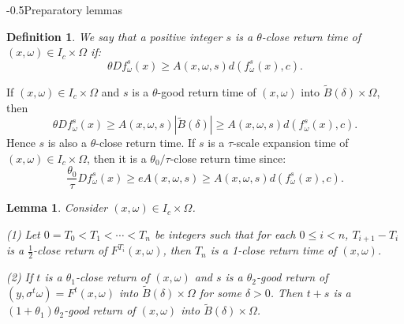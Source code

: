 \documentclass[11pt,oneside]{article}
\makeatletter
\newtheorem{definition}{Definition}[section]
\theoremstyle{plain}
\newtheorem{lem}{Lemma}[section]
\numberwithin{equation}{section}
\numberwithin{figure}{section}
\numberwithin{table}{section}
\renewcommand{\subsection}{\@startsection{subsection}{1}{0mm}
{-\baselineskip}{0.5\baselineskip}{\large\bf\leftline}}
\makeatother
\begin{document}
\subsection{Preparatory lemmas}

\begin{definition}
We say that a positive integer $s$ is a {\it $\theta$-close return time} of $(x, \omega) \in I_c \times \Omega$ if:
\[
\theta Df_{\omega}^s(x) \geq A(x, \omega, s) d(f_{\omega}^s(x), c).
\]
\end{definition}


If $(x, \omega) \in I_c \times \Omega$ and $s$ is a $\theta$-good return time of $(x, \omega)$ into $\tilde B(\delta) \times \Omega$, then 
\[
\theta Df_{\omega}^s(x) \geq A(x, \omega, s) |\tilde B(\delta)| \geq A(x, \omega, s) d(f_{\omega}^s(x), c).
\]
Hence $s$ is also a $\theta$-close return time. If $s$ is a $\tau$-scale expansion time of $(x, \omega) \in I_c \times \Omega$, then it is a $\theta_0/\tau$-close return time since:
\[
\frac{\theta_0}{\tau} Df_{\omega}^s(x) \geq e A(x, \omega, s) \geq A(x, \omega, s) d(f_{\omega}^s(x), c).
\]


\begin{lem}

Consider $(x, \omega) \in I_c \times \Omega$.


(1) Let $0 = T_0 < T_1 < \cdots < T_n$ be integers such that for each $0 \leq i < n$, $T_{i+1} - T_i$ is a $\frac{1}{2}$-close return of $F^{T_i} (x, \omega)$, then $T_n$ is a 1-close return time of $(x, \omega)$.

(2) If $t$ is a $\theta_1$-close return of $(x, \omega)$ and $s$ is a $\theta_2$-good return of $(y, \sigma^t \omega) = F^t(x, \omega)$ into $\tilde B(\delta) \times \Omega$ for some $\delta >0$. Then $t+s$ is a $(1 + \theta_1)\theta_2$-good return of $(x, \omega)$ into $\tilde B(\delta) \times \Omega$.

\end{lem}
\end{document}
